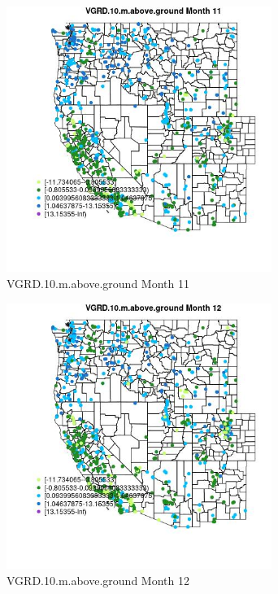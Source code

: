 \begin{figure} 
\centering  
\includegraphics[width=0.77\textwidth]{Code_Outputs/Report_ML_input_PM25_Step4_part_f_de_duplicated_aveswNAs_MapObsMo11VGRD10maboveground.jpg} 
\caption{\label{fig:Report_ML_input_PM25_Step4_part_f_de_duplicated_aveswNAsMapObsMo11VGRD10maboveground}VGRD.10.m.above.ground Month 11} 
\end{figure} 
 

\begin{figure} 
\centering  
\includegraphics[width=0.77\textwidth]{Code_Outputs/Report_ML_input_PM25_Step4_part_f_de_duplicated_aveswNAs_MapObsMo12VGRD10maboveground.jpg} 
\caption{\label{fig:Report_ML_input_PM25_Step4_part_f_de_duplicated_aveswNAsMapObsMo12VGRD10maboveground}VGRD.10.m.above.ground Month 12} 
\end{figure} 
 

